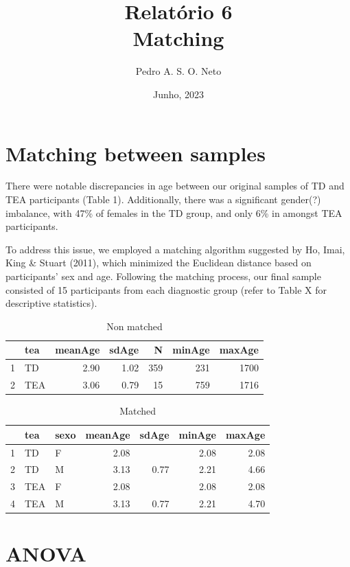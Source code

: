 \documentclass{article}
\title{Relatório 6 \\ Matching}
\author{Pedro A. S. O. Neto}
\date{Junho, 2023}
\begin{document}
\maketitle

\section{Matching between samples}

There were notable discrepancies in age between our original samples of TD and TEA participants (Table 1). Additionally, there was a significant gender(?) imbalance, with 47\% of females in the TD group, and only 6\% in amongst TEA participants.

To address this issue, we employed a matching algorithm suggested by Ho, Imai, King \& Stuart (2011), which minimized the Euclidean distance based on participants' sex and age. Following the matching process, our final sample consisted of 15 participants from each diagnostic group (refer to Table X for descriptive statistics).

\begin{table}[H]
\caption{Non matched}
\centering
\begin{tabular}{rlrrrrr}
    \hline
    & tea & meanAge & sdAge & N & minAge & maxAge \\ 
    \hline
    1 & TD & 2.90 & 1.02 & 359 & 231 & 1700 \\ 
    2 & TEA & 3.06 & 0.79 &  15 & 759 & 1716 \\ 
   \hline
\end{tabular}
\end{table}

\begin{table}[H]
\caption{Matched}
\centering
\begin{tabular}{rllrrrr}
  \hline
  & tea & sexo & meanAge & sdAge & minAge & maxAge \\ 
  \hline
  1 & TD & F & 2.08 &  & 2.08 & 2.08 \\ 
  2 & TD & M & 3.13 & 0.77 & 2.21 & 4.66 \\ 
  3 & TEA & F & 2.08 &  & 2.08 & 2.08 \\ 
  4 & TEA & M & 3.13 & 0.77 & 2.21 & 4.70 \\ 
   \hline
\end{tabular}
\end{table}

\section{ANOVA}
\end{document}
